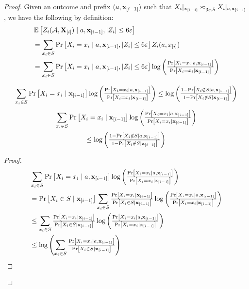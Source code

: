 \begin{proof}
 Given an outcome and prefix $(a,\mathbf{x}_{[i-1]})$ such that ${X_i|_{\mathbf{x}_{[i-1]}} \approx_{3\varepsilon,\hat{\delta}} X_i|_{a, \mathbf{x}_{[i-1]}}}$, we have the following by definition:
\begin{align*}
    &\operatorname*{\mathbb{E}}_{}\left[Z_i(\mathcal{A},\mathbf{X}_{[i]})\mid a,\mathbf{x}_{[i-1]}, \vert Z_i\rvert\leq 6\varepsilon\right]\\ 
    &=  \sum_{x_i\in S} \mathrm{Pr}\left[X_i = x_i\mid a,\mathbf{x}_{[i-1]}, \vert Z_i\rvert\leq 6\varepsilon\right] Z_i(a,x_{[i]})\\
    &=  \sum_{x_i\in S} \mathrm{Pr}\left[X_i = x_i\mid a,\mathbf{x}_{[i-1]}, \vert Z_i\rvert\leq 6\varepsilon\right] \log\left( \tfrac{\mathrm{Pr}\left[X_i = x_i \mid a,\mathbf{x}_{[i-1]}\right]}{\mathrm{Pr}\left[X_i = x_i \mid \mathbf{x}_{[i-1]}\right]} \right)
\end{align*}
\begin{claim}
\ifnum{}
    $$ \sum_{x_i\in S} \mathrm{Pr}\left[X_i = x_i\mid \mathbf{x}_{[i-1]}\right] \log\left( \tfrac{\mathrm{Pr}\left[X_i = x_i \mid a,\mathbf{x}_{[i-1]}\right]}{\mathrm{Pr}\left[X_i = x_i\mid\mathbf{x}_{[i-1]}\right]} \right) \leq \log\left(\tfrac{1 - \mathrm{Pr}\left[X_i \notin S\mid a,\mathbf{x}_{[i-1]}\right]}{1- \mathrm{Pr}\left[X_i \notin S\mid \mathbf{x}_{[i-1]}\right]} \right)$$
\else
\begin{multline*}
    \sum_{x_i\in S} \mathrm{Pr}\left[X_i = x_i\mid \mathbf{x}_{[i-1]}\right] \log\left( \tfrac{\mathrm{Pr}\left[X_i = x_i \mid a,\mathbf{x}_{[i-1]}\right]}{\mathrm{Pr}\left[X_i = x_i\mid\mathbf{x}_{[i-1]}\right]} \right) \\
    \leq \log\left(\tfrac{1 - \mathrm{Pr}\left[X_i \notin S\mid a,\mathbf{x}_{[i-1]}\right]}{1- \mathrm{Pr}\left[X_i \notin S\mid \mathbf{x}_{[i-1]}\right]} \right)
\end{multline*}
\fi
\end{claim}
\begin{proof}
\begin{align*}
& \sum_{x_i\in S} \prob{X_i = x_i\mid a,\bbx_{[i-1]}} \log\left( \tfrac{\prob{X_i = x_i \mid a,\bbx_{[i-1]}}}{\prob{X_i = x_i\mid\bbx_{[i-1]}}} \right)\\ 
&=\prob{X_i \in S\mid \bbx_{[i-1]}}  \sum_{x_i\in S}\tfrac{\prob{X_i = x_i\mid \bbx_{[i-1]}}}{\prob{X_i \in S\mid \bbx_{[i-1]}}}  \log\left( \tfrac{\prob{X_i = x_i \mid a,\bbx_{[i-1]}}}{\prob{X_i = x_i\mid\bbx_{[i-1]}}} \right)\\
&\leq  \sum_{x_i\in S}\tfrac{\prob{X_i = x_i\mid \bbx_{[i-1]}}}{\prob{X_i \in S\mid \bbx_{[i-1]}}}  \log\left( \tfrac{\prob{X_i = x_i \mid a,\bbx_{[i-1]}}}{\prob{X_i = x_i\mid\bbx_{[i-1]}}} \right)\\
&\leq \log\left( \sum_{x_i\in S}\tfrac{\prob{X_i = x_i \mid a,\bbx_{[i-1]}}}{\prob{X_i \in S\mid \bbx_{[i-1]}}}\right)\\

\end{align*}
\end{proof}
\end{proof}
